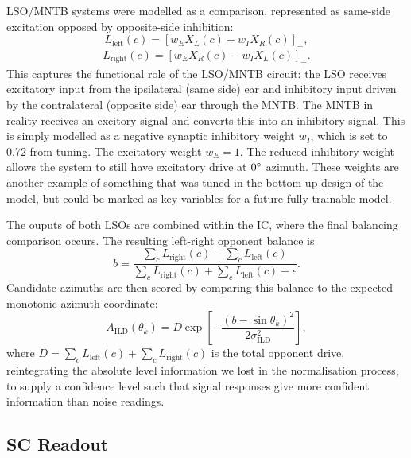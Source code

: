 LSO/MNTB systems were modelled as a comparison, represented as same-side excitation opposed by opposite-side inhibition:
\begin{equation}
    L_{\mathrm{left}}(c)
    =
    \left[
        w_E X_L(c)
        -
        w_I X_R(c)
    \right]_+,
\end{equation}
\begin{equation}
    L_{\mathrm{right}}(c)
    =
    \left[
        w_E X_R(c)
        -
        w_I X_L(c)
    \right]_+.
\end{equation}
This captures the functional role of the LSO/MNTB circuit: the LSO receives excitatory input from the ipsilateral (same side) ear and inhibitory input driven by the contralateral (opposite side) ear through the MNTB. The MNTB in reality receives an excitory signal and converts this into an inhibitory signal. This is simply modelled as a negative synaptic inhibitory weight $w_I$, which is set to 0.72 from tuning. The excitatory weight $w_E =1$. The reduced inhibitory weight allows the system to still have excitatory drive at $0\degree$ azimuth. These weights are another example of something that was tuned in the bottom-up design of the model, but could be marked as key variables for a future fully trainable model.

The ouputs of both LSOs are combined within the IC, where the final balancing comparison occurs. The resulting left-right opponent balance is
\begin{equation}
    b
    =
    \frac{
        \sum_c L_{\mathrm{right}}(c)
        -
        \sum_c L_{\mathrm{left}}(c)
    }{
        \sum_c L_{\mathrm{right}}(c)
        +
        \sum_c L_{\mathrm{left}}(c)
        +
        \epsilon
    }.
\end{equation}
Candidate azimuths are then scored by comparing this balance to the expected monotonic azimuth coordinate:
\begin{equation}
    A_{\mathrm{ILD}}(\theta_k)
    =
    D
    \exp
    \left[
        -
        \frac{
            \left(
                b-\sin\theta_k
            \right)^2
        }{
            2\sigma_{\mathrm{ILD}}^2
        }
    \right],
\end{equation}
where $D=\sum_c L_{\mathrm{left}}(c)+\sum_c L_{\mathrm{right}}(c)$ is the total opponent drive, reintegrating the absolute level information we lost in the normalisation process, to supply a confidence level such that signal responses give more confident information than noise readings.

\subsection{SC Readout}

